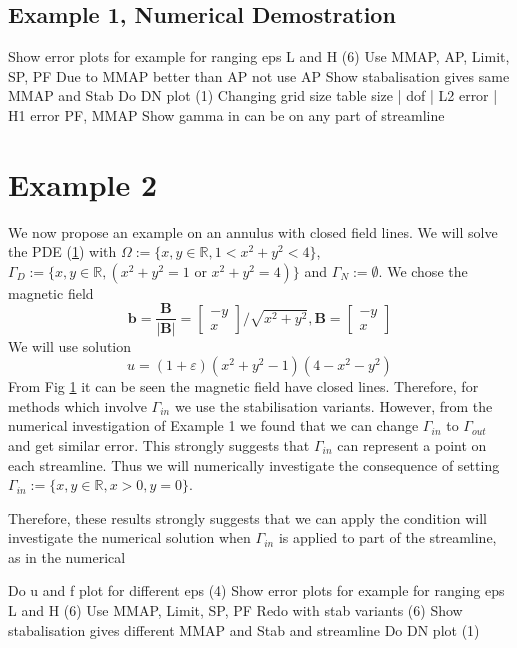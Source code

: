 \documentclass[12pt,a4paper]{article}
\begin{document}
\subsection{Example 1, Numerical Demostration}
Show error plots for example for ranging eps  L and H (6)
Use MMAP, AP, Limit, SP, PF
Due to MMAP better than AP not use AP
Show stabalisation gives same MMAP and Stab
Do DN plot (1)
Changing grid size table 
size | dof | L2 error | H1 error PF, MMAP
Show gamma in can be on any part of streamline

\section{Example 2}
We now propose an example on an annulus with closed field lines.
We will solve the PDE (\ref{}) with $\Omega := \{x,y \in \mathbb{R}, 1<x^2+y^2<4\}$, $\Gamma_D := \{x,y \in \mathbb{R}, (x^2+y^2=1 \text{ or } x^2+y^2=4)\}$ and $\Gamma_N := \emptyset$. We chose the magnetic field 
\begin{equation}
\mathbf{b} = \frac{\mathbf{B}}{|\mathbf{B}|} = 
\left[ \begin{matrix}
-y\\
 x
\end{matrix} \right]/\sqrt{x^2+y^2}, 
\mathbf{B} = \left[ \begin{matrix}
-y\\
 x
\end{matrix} \right]
\end{equation}
We will use solution
\begin{equation}
u = (1+\varepsilon)(x^2 + y^2 -1)(4-x^2-y^2)
\end{equation}
From Fig \ref{} it can be seen the magnetic field have closed lines. Therefore, for methods which involve $\Gamma_{in}$ we use the stabilisation variants. However, from the numerical investigation of Example 1 we found that we can change $\Gamma_{in}$ to $\Gamma_{out}$ and get similar error. This strongly suggests that $\Gamma_{in}$ can represent a point on each streamline. Thus we will numerically investigate the consequence of setting $\Gamma_{in}:=\{x,y \in \mathbb{R}, x>0, y=0\}$.




Therefore, these results strongly suggests that we can apply the condition  will investigate the numerical solution when $\Gamma_{in}$ is applied to part of the streamline, as in the numerical

Do u and f plot for different eps (4)
Show error plots for example for ranging eps  L and H (6)
Use MMAP, Limit, SP, PF
Redo with stab variants (6)
Show stabalisation gives different MMAP and Stab and streamline
Do DN plot (1)
\end{document}
